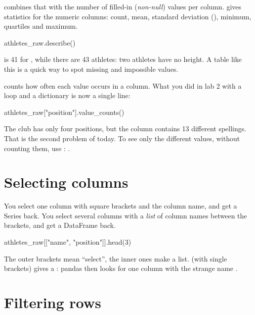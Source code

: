 \documentclass[11pt,a4paper]{article}
\begin{document}
\textbf{} combines that with the number of filled-in
(\emph{non-null}) values per column. \textbf{} gives
statistics for the numeric columns: count, mean, standard deviation
(), minimum, quartiles and maximum.

\begin{python}
athletes_raw.describe()
\end{python}

 is 41 for , while there are 43 athletes:
two athletes have no height. A table like this is a quick way to spot
missing and impossible values.

\textbf{} counts how often each value occurs in
a column. What you did in lab 2 with a loop and a dictionary is now a
single line:

\begin{python}
athletes_raw["position"].value_counts()
\end{python}

The club has only four positions, but the column contains 13 different
spellings. That is the second problem of today. To see only the
different values, without counting them, use :
.

\section{Selecting columns}

You select one column with square brackets and the column name, and get
a Series back. You select several columns with a \emph{list} of column
names between the brackets, and get a DataFrame back.

\begin{python}
athletes_raw[["name", "position"]].head(3)
\end{python}

\begin{watchout}
The outer brackets mean ``select'', the inner ones make a list.
 (with single brackets) gives a
: pandas then looks for one column with the strange name
.
\end{watchout}

\section{Filtering rows}
\end{document}
